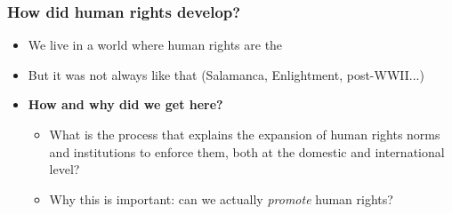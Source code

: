\documentclass[aspectratio=43]{beamer}
\begin{document}
\begin{frame}
\frametitle{How did human rights develop?}
\centering

\begin{itemize}
  \item We live in a world where human rights are the 
  \item<2-> But it was not always like that (Salamanca, Enlightment, post-WWII...)
  \item<3-> \textbf{How and why did we get here?}
  \begin{itemize}
    \item What is the process that explains the expansion of human rights norms and institutions to enforce them, both at the domestic and international level?
    \item<4-> Why this is important: can we actually \textit{promote} human rights?
  \end{itemize}
\end{itemize}


\end{frame}
\end{document}
